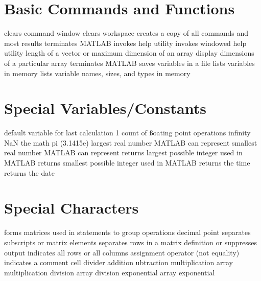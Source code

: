 
\def\content{\uppercase{MatLab}}
\def\shortcontent{\content}
\def\versionnumber{0.1}  %
\def\version{v\versionnumber\ \month\ \year}


\mytitle

\shortintro

\section{Basic Commands and Functions}{}
	{clears command window}
	{clears workspace}
	{creates a copy of all commands and most results}
	{terminates MATLAB}
	{invokes help utility}
	{invokes windowed help utility}
	{length of a vector or maximum dimension of an array}
	{display dimensions of a particular array}
	{terminates MATLAB}
	{saves variables in a file}
	{lists  variables in memory}
	{lists  variable names, sizes, and types in memory}

\section{Special Variables/Constants}{}
	{default variable for last calculation}
	{1}
	{count of ßoating point operations}
	{infinity}
	{NaN}
	{the math pi (3.1415e)}
	{largest real number MATLAB can represent}
	{smallest real number MATLAB can represent}
	{returns largest possible integer used in MATLAB}
	{returns smallest possible integer used in MATLAB}
	{returns the time}
	{returns the date}

\section{Special Characters}{}
\cmdOper{[]}	{forms matrices}
\cmdOper{()}	{used in statements to group operations}
	{decimal point}
\cmdOper{,! }	{separates subscripts or matrix elements}
\cmdOper{;}	{separates rows in a matrix definition or suppresses output}
\cmdOper{:}	{indicates all rows or all columns}
\cmdOper{=}	{assignment operator (not equality)}
\cmdOper{\%}	{indicates a comment}
\cmdOper{\%\%}	{cell divider}
\cmdOper{+}	{addition}
\cmdOper{-}	{ubtraction}
\cmdOper{*}	{multiplication}
	{array multiplication}
\cmdOper{/}	{division}
	{array division}
\cmdOper{\expon}	{exponential}
	{array exponential}

